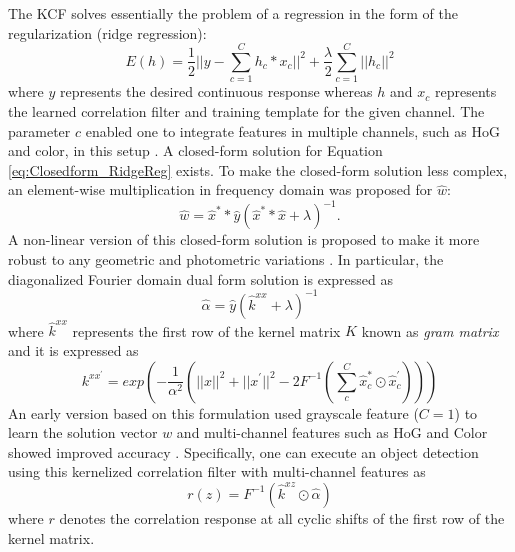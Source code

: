 \documentclass[10pt,twocolumn,letterpaper]{article}
\begin{document}
The KCF solves essentially the problem of a regression in the form of
the regularization (ridge regression):
\begin{equation}
E(h) = \frac{1}{2}||y-\sum_{c=1}^{C}h_{c}*x_{c}||^{2} + \frac{\lambda}{2}\sum_{c=1}^{C}||h_{c}||^{2}
\label{eq:Closedform_RidgeReg}
\end{equation}
where $y$ represents the desired continuous response whereas $h$ and
$x_{c}$ represents the learned correlation filter and training
template for the given channel. The parameter $c$ enabled one to
integrate features in multiple channels, such as HoG and color, in
this setup \cite{henriques2015high,galoogahi2013multi}. A closed-form
solution for Equation \ref{eq:Closedform_RidgeReg} exists. To make the
closed-form solution less complex, an element-wise multiplication in
frequency domain was proposed for $\hat{w}$:
\begin{equation}
\hat{w} = \hat{x}^{*}*\hat{y}(\hat{x}^{*}*\hat{x}+\lambda)^{-1}.
\label{eq:DiagonalizedPrimalSolution}
\end{equation}
A non-linear version of this closed-form solution is proposed to make
it more robust to any geometric and photometric variations
\cite{henriques2015high}. In particular, the diagonalized Fourier
domain dual form solution is expressed as
\begin{equation}
\hat{\alpha} = \hat{y}(\hat{k}^{xx}+\lambda)^{-1}
\label{eq:FourierDualDomainSolution}
\end{equation}
where $\hat{k}^{xx}$ represents the first row of the kernel matrix $K$
known as \textit{gram matrix} and it is expressed as
\begin{equation}
k^{xx^{'}} = exp(-\dfrac{1}{\alpha^{2}}(||x||^{2}+||x^{'}||^{2}-2F^{-1}(\sum^{C}_{c}\hat{x}_{c}^{*}\odot \hat{x}_{c}^{'})))
\label{eq:GaussianCorrelationSingleChannel}
\end{equation}
An early version based on this formulation used grayscale feature
($C=1$) to learn the solution vector $w$ and multi-channel features
such as HoG and Color showed improved accuracy
\cite{henriques2015high,galoogahi2013multi,tang2015multi,ma2015long,bibi2015multi}. Specifically,
one can execute an object detection using this kernelized correlation
filter with multi-channel features as
\begin{equation}
r(z) = F^{-1}(\hat{k}^{xz} \odot \hat{\alpha})
\end{equation}
where $r$ denotes the correlation response at all cyclic shifts of the
first row of the kernel matrix.
\end{document}
